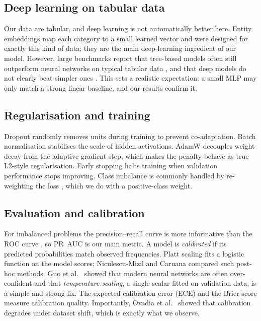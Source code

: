 \documentclass[conference]{IEEEtran}
\begin{document}
\subsection{Deep learning on tabular data}
Our data are tabular, and deep learning is not automatically better here. Entity embeddings \cite{guoberk} map each category to a small learned vector and were designed for exactly this kind of data; they are the main deep-learning ingredient of our model. However, large benchmarks report that tree-based models often still outperform neural networks on typical tabular data \cite{grinsztajn}, and that deep models do not clearly beat simpler ones \cite{shwartz}. This sets a realistic expectation: a small MLP may only match a strong linear baseline, and our results confirm it.

\subsection{Regularisation and training}
Dropout \cite{srivastava} randomly removes units during training to prevent co-adaptation. Batch normalisation \cite{ioffe} stabilises the scale of hidden activations. AdamW \cite{adamw} decouples weight decay from the adaptive gradient step, which makes the penalty behave as true L2-style regularisation. Early stopping \cite{prechelt} halts training when validation performance stops improving. Class imbalance is commonly handled by re-weighting the loss \cite{johnson}, which we do with a positive-class weight.

\subsection{Evaluation and calibration}
For imbalanced problems the precision--recall curve is more informative than the ROC curve \cite{davis,saito}, so PR~AUC is our main metric. A model is \emph{calibrated} if its predicted probabilities match observed frequencies. Platt scaling \cite{platt} fits a logistic function on the model scores; Niculescu-Mizil and Caruana \cite{nm} compared such post-hoc methods. Guo et al.\ \cite{guo} showed that modern neural networks are often over-confident and that \emph{temperature scaling}, a single scalar fitted on validation data, is a simple and strong fix. The expected calibration error (ECE) \cite{naeini} and the Brier score \cite{brier} measure calibration quality. Importantly, Ovadia et al.\ \cite{ovadia} showed that calibration degrades under dataset shift, which is exactly what we observe.
\end{document}

